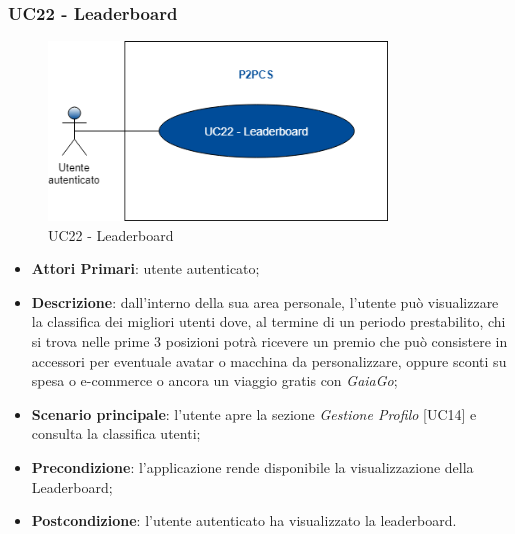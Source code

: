 \newpage
\subsubsection{UC22 - Leaderboard}
\begin{figure}[h]
	\includegraphics[width=9cm]{res/images/UC22Leaderboard.png}
	\centering
	\caption{UC22 - Leaderboard}
\end{figure}
\begin{itemize}
	\item \textbf{Attori Primari}: utente autenticato;
	\item \textbf{Descrizione}: dall'interno della sua area personale, l'utente può visualizzare la classifica dei migliori utenti dove, al termine di un periodo prestabilito, chi si trova nelle prime 3 posizioni potrà ricevere un premio che può consistere in accessori per eventuale avatar o macchina da personalizzare, oppure sconti su spesa o e-commerce o ancora un viaggio gratis con \textit{GaiaGo};
	\item \textbf{Scenario principale}: l'utente apre la sezione \textit{Gestione Profilo} [UC14] e consulta la classifica utenti;
	\item \textbf{Precondizione}: l'applicazione rende disponibile la visualizzazione della Leaderboard\glo;
	\item \textbf{Postcondizione}: l'utente autenticato ha visualizzato la leaderboard.
\end{itemize}

